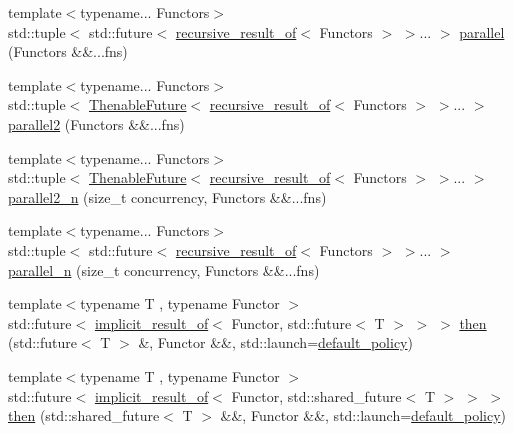 \begin{DoxyCompactItemize}
{\footnotesize template$<$typename... Functors$>$ }\\std\+::tuple$<$ std\+::future$<$ \hyperlink{namespacethenable_a71ee91c31ba9c80bb2d6f3effe4bae12}{recursive\+\_\+result\+\_\+of}$<$ Functors $>$ $>$... $>$ \hyperlink{namespacethenable_a95e108dc8790ef2db88424ea3ae46c79}{parallel} (Functors \&\&...fns)
\item 
{\footnotesize template$<$typename... Functors$>$ }\\std\+::tuple$<$ \hyperlink{classthenable_1_1_thenable_future}{Thenable\+Future}$<$ \hyperlink{namespacethenable_a71ee91c31ba9c80bb2d6f3effe4bae12}{recursive\+\_\+result\+\_\+of}$<$ Functors $>$ $>$... $>$ \hyperlink{namespacethenable_a4619a50a59383db8a890cc02d8e44262}{parallel2} (Functors \&\&...fns)
\item 
{\footnotesize template$<$typename... Functors$>$ }\\std\+::tuple$<$ \hyperlink{classthenable_1_1_thenable_future}{Thenable\+Future}$<$ \hyperlink{namespacethenable_a71ee91c31ba9c80bb2d6f3effe4bae12}{recursive\+\_\+result\+\_\+of}$<$ Functors $>$ $>$... $>$ \hyperlink{namespacethenable_ae386feb6dd2b3b1171a9f40f25b57f22}{parallel2\+\_\+n} (size\+\_\+t concurrency, Functors \&\&...fns)
\item 
{\footnotesize template$<$typename... Functors$>$ }\\std\+::tuple$<$ std\+::future$<$ \hyperlink{namespacethenable_a71ee91c31ba9c80bb2d6f3effe4bae12}{recursive\+\_\+result\+\_\+of}$<$ Functors $>$ $>$... $>$ \hyperlink{namespacethenable_ae08454ef27fbe2ce5a3f6b2b008a0bc2}{parallel\+\_\+n} (size\+\_\+t concurrency, Functors \&\&...fns)
\item 
{\footnotesize template$<$typename T , typename Functor $>$ }\\std\+::future$<$ \hyperlink{namespacethenable_a1ecf08d6ad8b8688d7b4df047b5feaae}{implicit\+\_\+result\+\_\+of}$<$ Functor, std\+::future$<$ T $>$ $>$ $>$ \hyperlink{namespacethenable_aa7417767a6d39589457c2569f900e9e8}{then} (std\+::future$<$ T $>$ \&, Functor \&\&, std\+::launch=\hyperlink{namespacethenable_a55a20a452e9ba9c0eff946d9b8636f06}{default\+\_\+policy})
\item 
{\footnotesize template$<$typename T , typename Functor $>$ }\\std\+::future$<$ \hyperlink{namespacethenable_a1ecf08d6ad8b8688d7b4df047b5feaae}{implicit\+\_\+result\+\_\+of}$<$ Functor, std\+::shared\+\_\+future$<$ T $>$ $>$ $>$ \hyperlink{namespacethenable_a591eb14beddb29e6d25591b5f85af87a}{then} (std\+::shared\+\_\+future$<$ T $>$ \&\&, Functor \&\&, std\+::launch=\hyperlink{namespacethenable_a55a20a452e9ba9c0eff946d9b8636f06}{default\+\_\+policy})

\end{DoxyCompactItemize}
